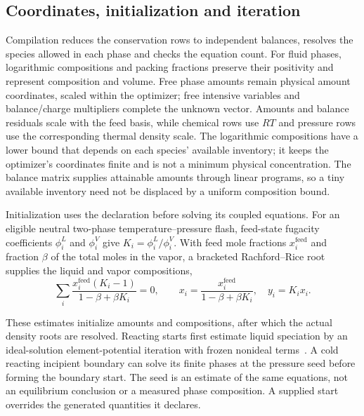 \subsection{Coordinates, initialization and iteration}
\label{sec:driver}
Compilation reduces the conservation rows to independent balances, resolves the species allowed in each phase and checks the equation count.
For fluid phases, logarithmic compositions and packing fractions preserve their positivity and represent composition and volume.
Free phase amounts remain physical amount coordinates, scaled within the optimizer; free intensive variables and balance/charge multipliers complete the unknown vector.
Amounts and balance residuals scale with the feed basis, while chemical rows use $RT$ and pressure rows use the corresponding thermal density scale.
The logarithmic compositions have a lower bound that depends on each species' available inventory; it keeps the optimizer's coordinates finite and is not a minimum physical concentration.
The balance matrix supplies attainable amounts through linear programs, so a tiny available inventory need not be displaced by a uniform composition bound.

\begin{samepage}
Initialization uses the declaration before solving its coupled equations.
For an eligible neutral two-phase temperature--pressure flash, feed-state fugacity coefficients $\phi_i^L$ and $\phi_i^V$ give $K_i=\phi_i^L/\phi_i^V$.
With feed mole fractions $x_i^{\mathrm{feed}}$ and fraction $\beta$ of the total moles in the vapor, a bracketed Rachford--Rice root supplies the liquid and vapor compositions,
\begin{equation}
\sum_i\frac{x_i^{\mathrm{feed}}(K_i-1)}{1-\beta+\beta K_i}=0,\qquad
x_i=\frac{x_i^{\mathrm{feed}}}{1-\beta+\beta K_i},\quad y_i=K_ix_i.
\label{eq:rr-start}
\end{equation}
\end{samepage}
These estimates initialize amounts and compositions, after which the actual density roots are resolved.
Reacting starts first estimate liquid speciation by an ideal-solution element-potential iteration with frozen nonideal terms~\citep{gordonComputerProgramCalculation1994}.
A cold reacting incipient boundary can solve its finite phases at the pressure seed before forming the boundary start.
The seed is an estimate of the same equations, not an equilibrium conclusion or a measured phase composition.
A supplied start overrides the generated quantities it declares.


